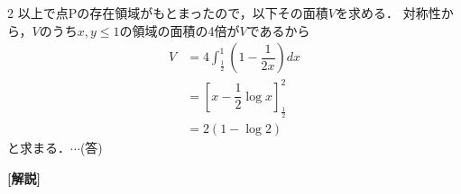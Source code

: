 \documentclass[../../main.tex]{subfiles}
\begin{document}
\begin{multicols}{2}
  以上で点Pの存在領域がもとまったので，以下その面積$V$を求める．
  対称性から，$V$のうち$x,y \le 1$の領域の面積の4倍が$V$であるから
  \begin{align}
    V
    & = 4 \int_{\frac{1}{2}}^{1} (1-\dfrac{1}{2x}) dx \\
    & = [x - \dfrac{1}{2} \log x]_{\frac{1}{2}}^2     \\
    & = 2(1-\log 2)
  \end{align}
  と求まる．$\cdots$(答)

  {\bf [解説]}

  \newpage
\end{multicols}
\end{document}
